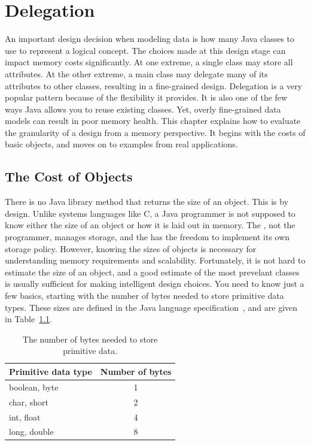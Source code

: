 \chapter{Delegation}
\label{chapter:delegation}

An important design decision when modeling data is how many Java classes to use to represent a logical concept. The choices made at this design stage can impact memory costs significantly. At one extreme, a single class may store all attributes. At the other extreme, a main class may delegate many of its attributes to other classes, resulting in a fine-grained design. Delegation is a very popular pattern because of the flexibility it provides. It is also one of the few ways Java allows you to reuse existing classes. Yet, overly fine-grained data models can result in poor memory health. This chapter explains how to evaluate the granularity of a design from a memory perspective. It begins with the costs of basic objects, and moves on to examples from real applications.
  
\section{The Cost of Objects}
\label{sec:CostOfObjects}

There is no Java library method that returns the size of an object. This is by
design. Unlike systems languages like C, a Java programmer is not supposed to
know either the size of an object or how it is laid out in memory. The \jre,
not the programmer, manages storage, and the \jre has the freedom to implement
its own storage policy. However, knowing the sizes of objects is necessary for understanding memory requirements and scalability. Fortunately, it is not hard to estimate the size of an object, and a good estimate of the most prevelant classes is usually sufficient for making intelligent design choices.  You need to know just a few basics, starting with the number of bytes needed to store primitive data types. These sizes are defined in the Java language specification~\cite{JavaSpec}, and are given in Table~\ref{tab:primitive-sizes}.
\begin{table}
  \centering
\begin{tabular}{lc} \toprule
	Primitive data type & Number of bytes \\ \midrule
	boolean, byte & 1 \\
	char, short & 2 \\
	int, float & 4 \\
	long, double & 8 \\
	\bottomrule
\end{tabular}
  \caption{The number of bytes needed to store primitive data.}
  \label{tab:primitive-sizes}
\end{table}


